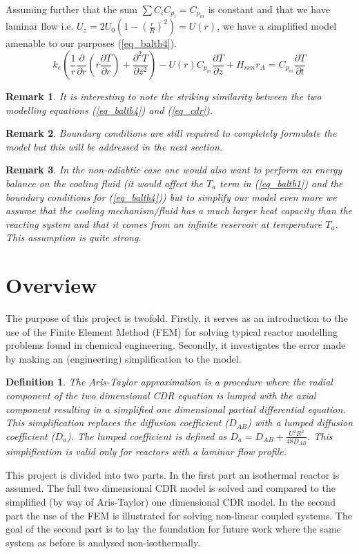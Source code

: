 \documentclass[11pt,fleqn]{article}
\theoremstyle{defstyle}
\newtheorem{defn}{Definition}[section]
\newtheorem{rmrk}{Remark}[section]
\begin{document}
Assuming further that the sum $\sum C_i C_{p_i} = C_{p_m}$ is constant and that we have laminar flow i.e. $U_z = 2U_0(1-(\frac{r}{R})^2) = U(r)$, we have a simplified model amenable to our purposes (\ref{eq_baltb4}).
\begin{equation}
k_e\left(\frac{1}{r}\frac{\partial}{\partial r}\left(r\frac{\partial T}{\partial r}\right) + \frac{\partial ^2 T}{\partial z^2}\right) - U(r) C_{p_m} \frac{\partial T}{\partial z} + H_{rxn}r_A = C_{p_m} \frac{\partial T}{\partial t}
\label{eq_baltb4}
\end{equation}
\begin{rmrk}
It is interesting to note the striking similarity between the two modelling equations (\ref{eq_baltb4}) and (\ref{eq_cdr}).
\end{rmrk}
\begin{rmrk}
Boundary conditions are still required to completely formulate the model but this will be addressed in the next section.
\end{rmrk}
\begin{rmrk}
In the non-adiabtic case one would also want to perform an energy balance on the cooling fluid (it would affect the $T_a$ term in (\ref{eq_baltb1}) and the boundary conditions for (\ref{eq_baltb4})) but to simplify our model even more we assume that the cooling mechanism/fluid has a much larger heat capacity than the reacting system and that it comes from an infinite reservoir at temperature $T_a$. This assumption is quite strong.
\end{rmrk}

\section{Overview}
The purpose of this project is twofold. Firstly, it serves as an introduction to the use of the Finite Element Method (FEM) for solving typical reactor modelling problems found in chemical engineering. Secondly, it investigates the error made by making an (engineering) simplification to the model.
\begin{defn}
The Aris-Taylor approximation is a procedure where the radial component of the two dimensional CDR equation is lumped with the axial component resulting in a simplified one dimensional partial differential equation. This simplification replaces the diffusion coefficient ($D_{AB}$) with a lumped diffusion coefficient ($D_a$). The lumped coefficient is defined as $D_a = D_{AB} + \frac{U^2R^2}{48D_{AB}}$. This simplification is valid only for reactors with a laminar flow profile. 
\end{defn}
This project is divided into two parts. In the first part an isothermal reactor is assumed. The full two dimensional CDR model is solved and compared to the simplified (by way of Aris-Taylor) one dimensional CDR model. In the second part the use of the FEM is illustrated for solving non-linear coupled systems. The goal of the second part is to lay the foundation for future work where the same system as before is analysed non-isothermally.
\end{document}
